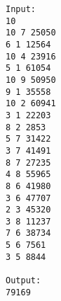 \begin{verbatim}
Input:
10
10 7 25050
6 1 12564
10 4 23916
5 1 61054
10 9 50950
9 1 35558
10 2 60941
3 1 22203
8 2 2853
5 7 31422
3 7 41491
8 7 27235
4 8 55965
8 6 41980
3 6 47707
2 3 45320
3 8 11237
7 6 38734
5 6 7561
3 5 8844

Output:
79169

\end{verbatim}